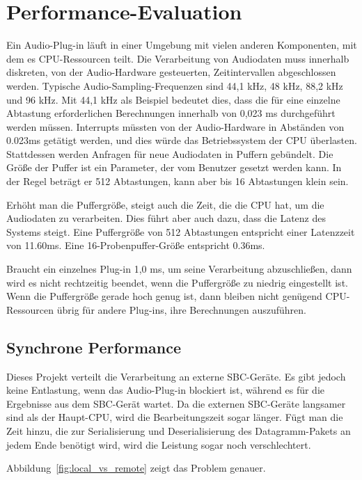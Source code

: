 \section{Performance-Evaluation}

Ein Audio-Plug-in läuft in einer Umgebung mit vielen anderen Komponenten, mit dem es CPU-Ressourcen teilt. Die Verarbeitung von Audiodaten muss innerhalb diskreten, von der Audio-Hardware gesteuerten, Zeitintervallen abgeschlossen werden. Typische Audio-Sampling-Frequenzen sind 44,1 kHz, 48 kHz, 88,2 kHz und 96 kHz. Mit 44,1 kHz als Beispiel bedeutet dies, dass die für eine einzelne Abtastung erforderlichen Berechnungen innerhalb von 0,023 ms durchgeführt werden müssen. Interrupts müssten von der Audio-Hardware in Abständen von 0.023ms getätigt werden, und dies würde das Betriebssystem der CPU überlasten. Stattdessen werden Anfragen für neue Audiodaten in Puffern gebündelt. Die Größe der Puffer ist ein Parameter, der vom Benutzer gesetzt werden kann. In der Regel beträgt er 512 Abtastungen, kann aber bis 16 Abtastungen klein sein.

Erhöht man die Puffergröße, steigt auch die Zeit, die die CPU hat, um die Audiodaten zu verarbeiten. Dies führt aber auch dazu, dass die Latenz des Systems steigt. Eine Puffergröße von 512 Abtastungen entspricht einer Latenzzeit von 11.60ms. Eine 16-Probenpuffer-Größe entspricht 0.36ms.

Braucht ein einzelnes Plug-in 1,0 ms, um seine Verarbeitung abzuschließen, dann wird es nicht rechtzeitig beendet, wenn die Puffergröße zu niedrig eingestellt ist. Wenn die Puffergröße gerade hoch genug ist, dann bleiben nicht genügend CPU-Ressourcen übrig für andere Plug-ins, ihre Berechnungen auszuführen.

\subsection{Synchrone Performance}

Dieses Projekt verteilt die Verarbeitung an externe SBC-Geräte. Es gibt jedoch keine Entlastung, wenn das Audio-Plug-in blockiert ist, während es für die Ergebnisse aus dem SBC-Gerät wartet. Da die externen SBC-Geräte langsamer sind als der Haupt-CPU, wird die Bearbeitungszeit sogar länger. Fügt man die Zeit hinzu, die zur Serialisierung und Deserialisierung des Datagramm-Pakets an jedem Ende benötigt wird, wird die Leistung sogar noch verschlechtert.

Abbildung~\ref{fig:local_vs_remote} zeigt das Problem genauer.

